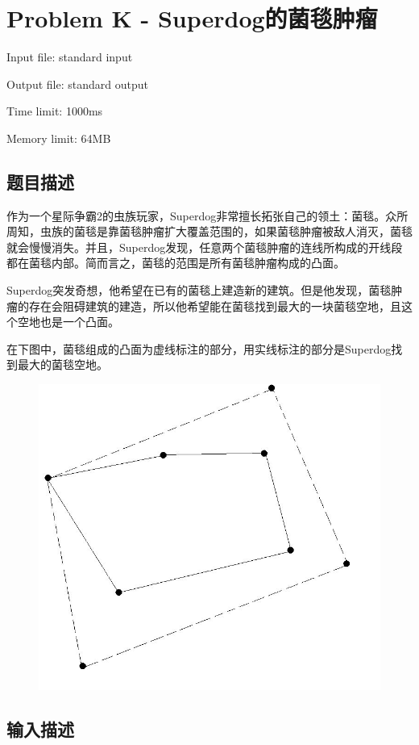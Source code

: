 \newpage
\section{Problem K - Superdog的菌毯肿瘤}
{ \limitfont{}
Input file: standard input \par
Output file: standard output \par
Time limit: 1000ms \par
Memory limit: 64MB \par
}
\subsection*{题目描述}
作为一个星际争霸2的虫族玩家，Superdog非常擅长拓张自己的领土：菌毯。众所周知，虫族的菌毯是靠菌毯肿瘤扩大覆盖范围的，如果菌毯肿瘤被敌人消灭，菌毯就会慢慢消失。并且，Superdog发现，任意两个菌毯肿瘤的连线所构成的开线段都在菌毯内部。简而言之，菌毯的范围是所有菌毯肿瘤构成的凸面。

Superdog突发奇想，他希望在已有的菌毯上建造新的建筑。但是他发现，菌毯肿瘤的存在会阻碍建筑的建造，所以他希望能在菌毯找到最大的一块菌毯空地，且这个空地也是一个凸面。

在下图中，菌毯组成的凸面为虚线标注的部分，用实线标注的部分是Superdog找到最大的菌毯空地。
\begin{figure}[H]
    \centering
    \includegraphics[scale=0.6]{./src/k.png}
\end{figure}
\subsection*{输入描述}


